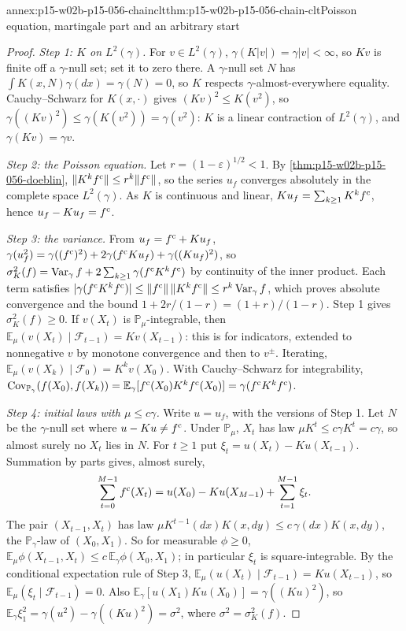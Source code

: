 \begin{annexitem}{annex:p15-w02b-p15-056-chainclt}{thm:p15-w02b-p15-056-chain-clt}{Poisson equation, martingale part and an arbitrary start}
\begin{proof}
\emph{Step 1: \(K\) on \(L^2(\gamma)\).} For \(v\in L^2(\gamma)\),
\(\gamma(K|v|)=\gamma|v|<\infty\), so \(Kv\) is finite off a
\(\gamma\)-null set; set it to zero there. A \(\gamma\)-null set \(N\) has
\(\int K(x,N)\gamma(dx)=\gamma(N)=0\), so \(K\) respects
\(\gamma\)-almost-everywhere equality. Cauchy--Schwarz for
\(K(x,\cdot)\) gives \((Kv)^2\leq K(v^2)\), so
\(\gamma((Kv)^2)\leq\gamma(K(v^2))=\gamma(v^2)\): \(K\) is a linear
contraction of \(L^2(\gamma)\), and \(\gamma(Kv)=\gamma v\).

\emph{Step 2: the Poisson equation.} Let \(r=(1-\varepsilon)^{1/2}<1\).
By \cref{thm:p15-w02b-p15-056-doeblin},
\(\|K^kf^{\rm c}\|\leq r^k\|f^{\rm c}\|\), so the series \(u_f\) converges
absolutely in the complete space \(L^2(\gamma)\). As \(K\) is continuous
and linear, \(Ku_f=\sum_{k\geq1}K^kf^{\rm c}\), hence
\(u_f-Ku_f=f^{\rm c}\).

\emph{Step 3: the variance.} From \(u_f=f^{\rm c}+Ku_f\),
\(\gamma(u_f^2)=\gamma((f^{\rm c})^2)+2\gamma(f^{\rm c}Ku_f)+\gamma((Ku_f)^2)\),
so
\(\sigma^2_K(f)=\operatorname{Var}_\gamma f+2\sum_{k\geq1}\gamma(f^{\rm c}K^kf^{\rm c})\)
by continuity of the inner product. Each term satisfies
\(|\gamma(f^{\rm c}K^kf^{\rm c})|\leq\|f^{\rm c}\|\,\|K^kf^{\rm c}\|\leq r^k\operatorname{Var}_\gamma f\),
which proves absolute convergence and the bound
\(1+2r/(1-r)=(1+r)/(1-r)\). Step 1 gives \(\sigma^2_K(f)\geq0\). If \(v(X_t)\) is
\(\mathbb P_\mu\)-integrable, then
\(\mathbb E_\mu(v(X_t)\mid\mathcal F_{t-1})=Kv(X_{t-1})\): this is
\cite[Theorem~5.2.1, p.~274]{DurrettPTEAuthor2019} for indicators, extended
to nonnegative \(v\) by monotone convergence and then to \(v^\pm\).
Iterating, \(\mathbb E_\mu(v(X_k)\mid\mathcal F_0)=K^kv(X_0)\). With Cauchy--Schwarz for integrability,
\(\operatorname{Cov}_{\mathbb P_\gamma}(f(X_0),f(X_k))
=\mathbb E_\gamma[f^{\rm c}(X_0)K^kf^{\rm c}(X_0)]=\gamma(f^{\rm c}K^kf^{\rm c})\).

\emph{Step 4: initial laws with \(\mu\leq c\gamma\).} Write \(u=u_f\), with
the versions of Step 1. Let \(N\) be the \(\gamma\)-null set where
\(u-Ku\neq f^{\rm c}\). Under \(\mathbb P_\mu\), \(X_t\) has law
\(\mu K^t\leq c\gamma K^t=c\gamma\), so almost surely no \(X_t\) lies in
\(N\). For \(t\geq1\) put \(\xi_t=u(X_t)-Ku(X_{t-1})\). Summation by
parts gives, almost surely,
\[
 \sum_{t=0}^{M-1}f^{\rm c}(X_t)=u(X_0)-Ku(X_{M-1})+\sum_{t=1}^{M-1}\xi_t .
\]
The pair \((X_{t-1},X_t)\) has law \(\mu K^{t-1}(dx)K(x,dy)\leq
c\,\gamma(dx)K(x,dy)\), the \(\mathbb P_\gamma\)-law of \((X_0,X_1)\). So
for measurable \(\phi\geq0\),
\(\mathbb E_\mu\phi(X_{t-1},X_t)\leq c\,\mathbb E_\gamma\phi(X_0,X_1)\);
in particular \(\xi_t\) is square-integrable. By the conditional
expectation rule of Step 3, \(\mathbb E_\mu(u(X_t)\mid\mathcal F_{t-1})=Ku(X_{t-1})\),
so \(\mathbb E_\mu(\xi_t\mid\mathcal F_{t-1})=0\). Also
\(\mathbb E_\gamma[u(X_1)Ku(X_0)]=\gamma((Ku)^2)\), so
\(\mathbb E_\gamma\xi_1^2=\gamma(u^2)-\gamma((Ku)^2)=\sigma^2\), where
\(\sigma^2=\sigma^2_K(f)\).


\end{proof}
\end{annexitem}
